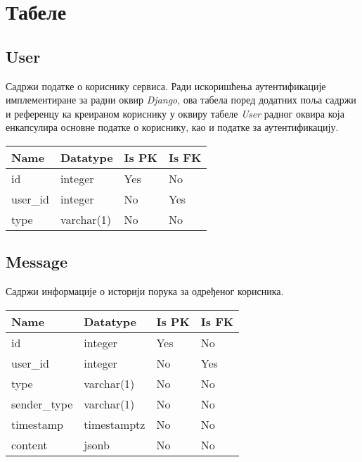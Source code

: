 \section{Табеле}
\subsection{User}

Садржи податке о кориснику сервиса. Ради искоришћења аутентификације имплементиране за радни оквир 
\textit{Django}, ова табела поред додатних поља садржи и референцу ка креираном кориснику у оквиру
табеле \textit{User} радног оквира која енкапсулира основне податке о кориснику, као и податке за
аутентификацију.

\vspace{0.5cm}

\noindent
\setcellgapes{4pt}
\makegapedcells
\begin{tabularx}{\linewidth}{|X|X|X|X|}
    \hline
    \textbf{Name} & \textbf{Datatype} & \textbf{Is PK} & \textbf{Is FK} \\
    \hline
    id & integer & Yes & No \\
    \hline
    user\_id & integer & No & Yes \\
    \hline
    type & varchar(1) & No & No \\
    \hline
\end{tabularx}

\subsection{Message}

Садржи информације о историји порука за одређеног корисника.

\vspace{0.5cm}

\noindent
\setcellgapes{4pt}
\makegapedcells
\begin{tabularx}{\linewidth}{|X|X|X|X|}
    \hline
    \textbf{Name} & \textbf{Datatype} & \textbf{Is PK} & \textbf{Is FK} \\
    \hline
    id & integer & Yes & No \\
    \hline
    user\_id & integer & No & Yes \\
    \hline
    type & varchar(1) & No & No \\
    \hline
    sender\_type & varchar(1) & No & No \\
    \hline
    timestamp & timestamptz & No & No \\
    \hline
    content & jsonb & No & No \\
    \hline
\end{tabularx}

